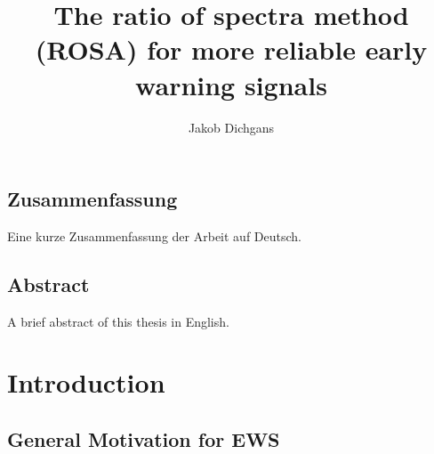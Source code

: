 \documentclass[%
thesis=student,%
coverpage=false,%
titlepage=false,%
headmarks=true, %
english,%
font=libertine, %
math=newpxtx, %
BCOR=5mm,%
coverBCOR=11mm%
]{tumbook}
\title{The ratio of spectra method (ROSA) for more reliable early warning signals}
\author{Jakob Dichgans}
\begin{document}
\frontmatter
\maketitle

\section*{Zusammenfassung}
Eine kurze Zusammenfassung der Arbeit auf Deutsch.

\section*{Abstract}
A brief abstract of this thesis in English.

\cleardoublepage{}

\tableofcontents

\mainmatter{}
\chapter{Introduction}

\section{General Motivation for EWS}%
\label{sec:General  Motivation for EWS}
\end{document}

